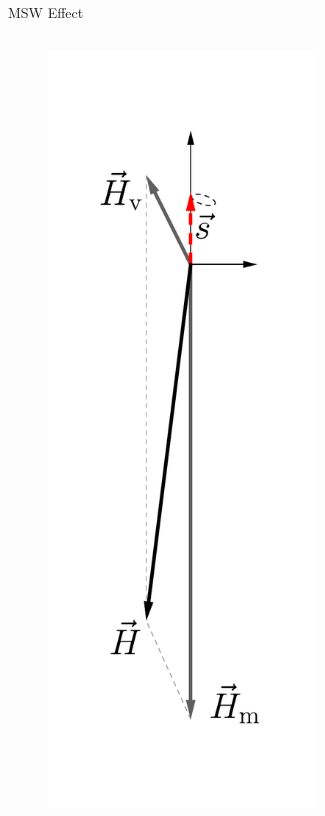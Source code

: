 \begin{frame}{MSW Effect}
\begin{columns}[T]
\begin{column}{0.33\textwidth}
\begin{figure}
    \centering
    \colorbox{white}{\includegraphics[width=0.7\textwidth]{assets/matter-effect-large-density}}
\end{figure}


\end{column}%
\begin{column}{0.33\textwidth}


\end{column}
\end{columns}
\end{frame}
